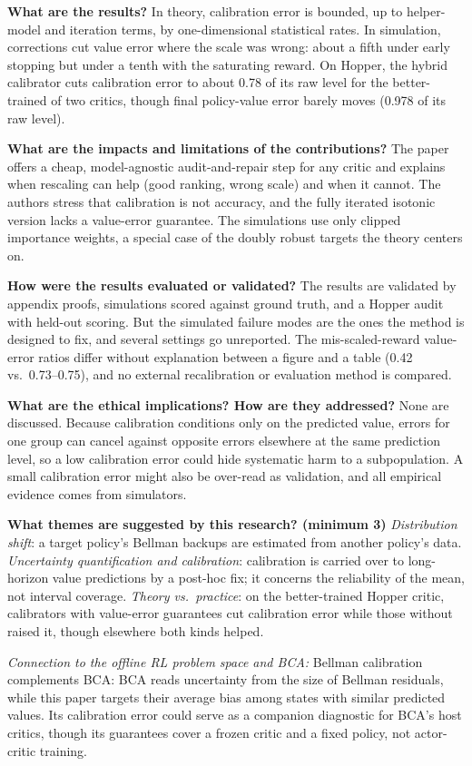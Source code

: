 \documentclass[11pt]{article}
\newcommand{\q}[2]{\item \textbf{#1} #2}
\newcommand{\tiein}[1]{\par\smallskip\noindent\emph{Connection to the offline RL problem space and BCA:} #1\par\medskip}
\begin{document}
\begin{qna}
\q{What are the results?}
In theory, calibration error is bounded, up to helper-model and iteration terms, by one-dimensional statistical rates. In simulation, corrections cut value error where the scale was wrong: about a fifth under early stopping but under a tenth with the saturating reward. On Hopper, the hybrid calibrator cuts calibration error to about 0.78 of its raw level for the better-trained of two critics, though final policy-value error barely moves (0.978 of its raw level).

\q{What are the impacts and limitations of the contributions?}
The paper offers a cheap, model-agnostic audit-and-repair step for any critic and explains when rescaling can help (good ranking, wrong scale) and when it cannot. The authors stress that calibration is not accuracy, and the fully iterated isotonic version lacks a value-error guarantee. The simulations use only clipped importance weights, a special case of the doubly robust targets the theory centers on.

\q{How were the results evaluated or validated?}
The results are validated by appendix proofs, simulations scored against ground truth, and a Hopper audit with held-out scoring. But the simulated failure modes are the ones the method is designed to fix, and several settings go unreported. The mis-scaled-reward value-error ratios differ without explanation between a figure and a table (0.42 vs.\ 0.73--0.75), and no external recalibration or evaluation method is compared.

\q{What are the ethical implications? How are they addressed?}
None are discussed. Because calibration conditions only on the predicted value, errors for one group can cancel against opposite errors elsewhere at the same prediction level, so a low calibration error could hide systematic harm to a subpopulation. A small calibration error might also be over-read as validation, and all empirical evidence comes from simulators.

\q{What themes are suggested by this research? (minimum 3)}
\emph{Distribution shift}: a target policy's Bellman backups are estimated from another policy's data. \emph{Uncertainty quantification and calibration}: calibration is carried over to long-horizon value predictions by a post-hoc fix; it concerns the reliability of the mean, not interval coverage. \emph{Theory vs.\ practice}: on the better-trained Hopper critic, calibrators with value-error guarantees cut calibration error while those without raised it, though elsewhere both kinds helped.

\end{qna}
\tiein{Bellman calibration complements BCA: BCA reads uncertainty from the size of Bellman residuals, while this paper targets their average bias among states with similar predicted values. Its calibration error could serve as a companion diagnostic for BCA's host critics, though its guarantees cover a frozen critic and a fixed policy, not actor-critic training.}
\end{document}
